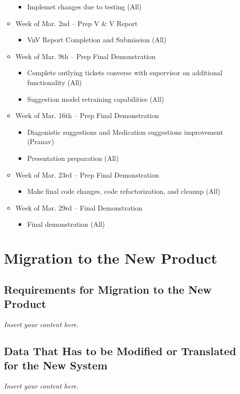 \documentclass[12pt]{article}
\newcommand{\lips}{\textit{Insert your content here.}}
\begin{document}
\begin{itemize}
\begin{itemize}
\begin{itemize}
      \item Implemet changes due to testing (All)
    \end{itemize}
  \item Week of Mar. 2nd -- Prep V & V Report
    \begin{itemize}
      \item VnV Report Completion and Submission (All)
    \end{itemize}
  \item Week of Mar. 9th -- Prep Final Demonstration
    \begin{itemize}
      \item Complete outlying tickets converse with supervisor on additional functionality (All)
      \item Suggestion model retraining capabilities (All)
    \end{itemize}
  \item Week of Mar. 16th -- Prep Final Demonstration
    \begin{itemize}
      \item Diagonistic suggestions and Medication suggestions improvement (Pranav)
      \item Presentation preparation (All)
    \end{itemize}
  \item Week of Mar. 23rd -- Prep Final Demonstration
    \begin{itemize}
      \item Make final code changes, code refactorization, and cleanup (All)
    \end{itemize}
  \item Week of Mar. 29rd -- Final Demonstration
    \begin{itemize}
      \item Final demonstration (All)
    \end{itemize}

\end{itemize}

\section{Migration to the New Product}
\subsection{Requirements for Migration to the New Product}
\lips
\subsection{Data That Has to be Modified or Translated for the New System}
\lips


\end{itemize}
\end{document}
